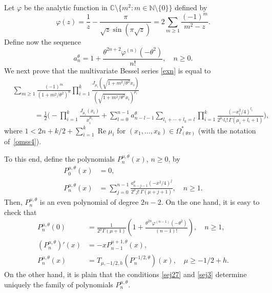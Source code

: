 \documentclass[12pt,leqno]{amsart}
\numberwithin{equation}{section}
\theoremstyle{plain}
\newcommand{\NN}{\mathbb{N}}
\newcommand{\CC}{\mathbb{C}}
\renewcommand{\Re}{\operatorname{Re}}
\begin{document}
Let $\varphi$ be the analytic function in $\CC\setminus\{m^2: m\in \NN\setminus\{0\}\}$ defined by
\begin{equation}
\label{sej}
\varphi(z) = \frac{1}{z}-\frac{\pi}{\sqrt z\sin(\pi \sqrt {z})}
= 2 \sum_{m\ge 1}\frac{(-1)^m}{m^2-z}.
\end{equation}
Define now the sequence
\begin{equation*}
a_{n}^{\theta} = 1+\frac{\theta^{2n+2}\varphi^{(n)}(-\theta^2)}{n!} , 
\quad n\ge0.
\end{equation*}
We next prove that the multivariate Bessel series \eqref{exn} is equal to
\begin{align}
\label{sejh}
& \sum_{m\ge 1} \frac{(-1)^m}{(1+m^2/\theta ^2)^{n}} \prod_{i=1}^k
\frac{J_{\mu_i}(\sqrt{1+m^2/\theta ^2}x_i)}
  {(\sqrt{1+m^2/\theta ^2}x_i)^{\mu_i}} \\
\nonumber
&\qquad\quad
= \frac{1}{2} \Bigg({-}\prod_{i=1}^k\frac{J_{\mu_i}(x_i)}{x_i^{\mu_i}} 
+ \sum_{l=0}^{n-1}a_{n-l-1}^{\theta} \sum_{l_1+\cdots+l_k=l}
\prod_{i=1}^k\frac{(-x_i^2/4)^{l_i}}
   {2^{\mu_i} l_i!\,\Gamma(\mu_i +l_i+1)} \Bigg),
\end{align}
where $1<2n+k/2+ \sum_{i=1}^k\Re \mu_i$ for $(x_1,\dots, x_k)\in\Omega_{(\theta \pi)}^*$ 
(with the notation of~\eqref{omss4}).

To this end, define the polynomials $P_n^{\mu,\theta}(x)$, $n\ge 0$, by
\begin{align}
\nonumber%
P_0^{\mu,\theta }(x) &= 0,\\
\label{sej21}
P_n^{\mu,\theta }(x) &= \sum_{j=0}^{n-1}
\frac{a_{n-j-1}^{\theta}(-x^2/4)^{j}}{2^{\mu} j!\,\Gamma(\mu+j+1)}, \quad n\ge 1.
\end{align}
Then, $P_n^{\mu,\theta }$ is an even polynomial of degree $2n-2$. On the one hand, it is easy to check that
\begin{align}
\label{sej27}
P_n^{\mu,\theta }(0) &= \frac{1}{2^{\mu} \Gamma(\mu+1)}
\left(1+\frac{\theta ^{2n}\varphi^{(n-1)}(-\theta ^2)}{(n-1)!}\right), 
\quad n\ge 1,\\
\label{sej3}
(P_n^{\mu,\theta })'(x) &= -xP_{n-1}^{\mu+1,\theta }(x),\\
\nonumber%
P_n^{\mu,\theta }(x) &= T_{\mu,-1/2,h}(P_n^{-1/2,\theta})(x),\quad \mu\ge -1/2+h.
\end{align}
On the other hand, it is plain that the conditions \eqref{sej27} and \eqref{sej3} determine uniquely the family of polynomials $P_{n}^{\mu,\theta}$.
\end{document}
